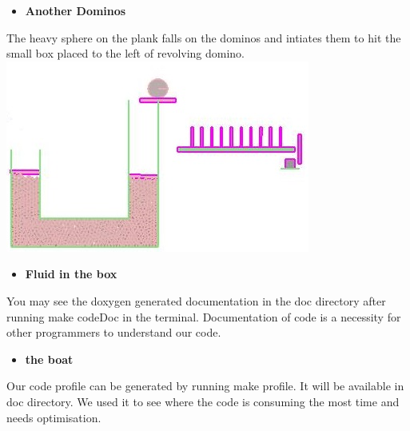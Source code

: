 \documentclass{article}
\begin{document}
\begin{itemize}
        \begin{itemize}[label=$\blacksquare$] \vspace{0cm}
            \item \textbf{\Large Another Dominos } 
        \end{itemize}
        \large The heavy sphere on the plank falls on the dominos and intiates them to hit the small box placed to the left of revolving domino.\\ \vspace{0.65 cm}
        \includegraphics[width=1 \linewidth]{ashna.jpg}\\
\clearpage

        \begin{itemize}[label=$\blacksquare$] \vspace{0cm}
            \item \textbf{\Large Fluid in the box } 
        \end{itemize}
        \large You may see the doxygen generated documentation in the doc directory after running make codeDoc in the terminal. Documentation of code is a necessity for other programmers to understand our code.\\ \vspace{0.65 cm}

        \begin{itemize}[label=$\blacksquare$] \vspace{0cm}
            \item \textbf{\Large the boat} 
        \end{itemize}
        \large Our code profile can be generated by running make profile. It will be available in doc directory. We used it to see where the code is consuming the most time and needs optimisation. \\ \vspace{0.65 cm}


\end{itemize}
\end{document}
